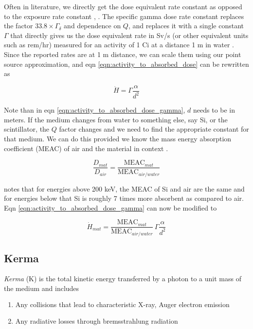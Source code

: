 \documentclass{article}
\begin{document}
Often in literature, we directly get the dose equivalent rate constant as opposed to the exposure rate constant \cite{Peplow2020}, \cite{IEMGammaConstants}. The specific gamma dose rate constant replaces 
the factor $33.8 \times \Gamma_{\delta}$ and dependence on $Q$, and replaces it with a single constant $\Gamma$ that directly gives us the dose equivalent rate in Sv/s (or other equivalent units such as rem/hr) measured for an activity of 1 Ci at a distance 1 m 
in water \cite{IEMGammaConstants}. Since the reported rates are at 1 m distance, we can scale them using our point source approximation, and eqn \ref{eqn:activity_to_absorbed_dose} can be rewritten as


 \begin{equation}\label{eqn:activity_to_absorbed_dose_gamma}
    \dot{H}  = \Gamma \frac{\alpha}{d^2}
\end{equation}


Note than in eqn \ref{eqn:activity_to_absorbed_dose_gamma}, $d$ needs to be in meters. If the medium changes from water to something else, say Si, or the scintillator, the $Q$ factor changes and we need to find the appropriate constant for that medium.
We can do this provided we know the mass energy absorption coefficient (MEAC) of air and the material in context \cite{RadSafe1998Gamma}.

\[\frac{D_{mat}}{D_{air}} = \frac{\text{MEAC}_{mat}}{\text{MEAC}_{air/water}}\]

\cite{BNDHEPIrradiationApparatus} notes that for energies above 200 keV, the MEAC of Si and air are the same and for energies below that Si is roughly 7 times more absorbent as compared to air.
Eqn \ref{eqn:activity_to_absorbed_dose_gamma} can now be modified to 

 \begin{equation}\label{eqn:activity_to_absorbed_dose_gamma_any_mat}
    \dot{H}_{mat}  =  \frac{\text{MEAC}_{mat}}{\text{MEAC}_{air/water}} \, \Gamma \frac{\alpha}{d^2}
\end{equation}


\subsection{Kerma}

\textit{Kerma} (K) is the total kinetic energy transferred by a photon to a unit mass of the medium and includes 

\begin{enumerate}
    \item Any collisions that lead to characteristic X-ray, Auger electron emission
    \item Any radiative losses through bremsstrahlung radiation
\end{enumerate}
\end{document}
